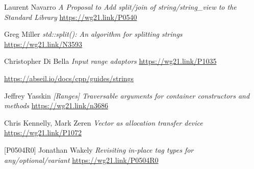 \documentclass{wg21}
\begin{document}
\begin{thebibliography}{9}
    Laurent Navarro
    \emph{A Proposal to Add split/join of string/string_view to the Standard Library}\newline
    \url{https://wg21.link/P0540}

    Greg Miller
    \emph{std::split(): An algorithm for splitting strings}\newline
    \url{https://wg21.link/N3593}

    Christopher Di Bella
    \emph{Input range adaptors}\newline
    \url{https://wg21.link/P1035}

    \url{https://abseil.io/docs/cpp/guides/strings}

    Jeffrey Yasskin
    \emph{[Ranges] Traversable arguments for container constructors and methods}\newline
    \url{https://wg21.link/n3686}

	Chris Kennelly, Mark Zeren
	\emph{Vector as allocation transfer device}
	\url{https://wg21.link/P1072}
	
[P0504R0]
	Jonathan Wakely
	\emph{Revisiting in-place tag types for any/optional/variant}
	\url{https://wg21.link/P0504R0}

	
\end{thebibliography}
\end{document}
